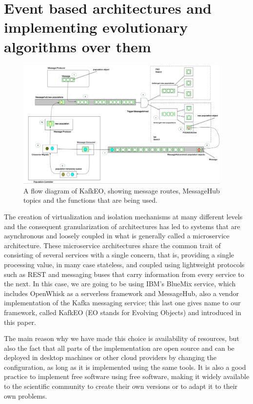 \documentclass[sigconf]{acmart}
\begin{document}
\section{Event based architectures and implementing evolutionary
  algorithms over them}
\label{sec:methods}
%
\begin{figure}[h!tbp]
\includegraphics[width=0.95\textwidth]{img/kafkEO.png}
\caption{A flow diagram of KafkEO, showing message routes, MessageHub
  topics and the functions that are being used.}
\label{fig:kafkeo2}
\end{figure}
%
The creation of virtualization and isolation mechanisms at many
different levels and the consequent granularization of architectures
has led to systems that are asynchronous and loosely coupled in what
is generally called a microservice architecture. These microservice
architectures share the common trait of consisting of several services
with a single concern, that is, providing a single processing value,
in many case stateless, and coupled using lightweight protocols such
as REST and messaging buses that carry information from every service
to the next. In this case, we are going to be using IBM's BlueMix
service, which includes OpenWhisk as a serverless framework and
MessageHub, also a vendor implementation of the Kafka messaging
service; this last one gives name to our framework, called KafkEO (EO
stands for Evolving Objects) and introduced in this paper.

The main reason why we have made this choice is availability of
resources, but also
the fact that all parts of the implementation are open source and can
be deployed in desktop machines or other cloud providers by changing
the configuration, as long as it is implemented using the same tools. It is also a good practice to implement free
software using free software, making it widely available to the
scientific community to create their own versions or to adapt it to
their own problems.
\end{document}
